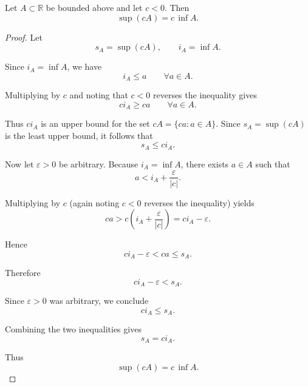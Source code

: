 \begin{theorem}
Let $A \subset \mathbb{R}$ be bounded above and let $c<0$.
Then
\[
\sup(cA)=c\,\inf A .
\]
\end{theorem}

\begin{proof}
Let
\[
s_A = \sup(cA), \qquad i_A = \inf A .
\]

Since $i_A=\inf A$, we have
\[
i_A \le a \qquad \forall a \in A.
\]

Multiplying by $c$ and noting that $c<0$ reverses the inequality gives
\[
c i_A \ge c a \qquad \forall a \in A.
\]

Thus $c i_A$ is an upper bound for the set $cA=\{ca : a\in A\}$.
Since $s_A=\sup(cA)$ is the least upper bound, it follows that
\[
s_A \le c i_A.
\]

Now let $\varepsilon>0$ be arbitrary. Because $i_A=\inf A$, there exists
$a\in A$ such that
\[
a < i_A + \frac{\varepsilon}{|c|}.
\]

Multiplying by $c$ (again noting $c<0$ reverses the inequality) yields
\[
c a > c\!\left(i_A + \frac{\varepsilon}{|c|}\right)
     = c i_A - \varepsilon .
\]

Hence
\[
c i_A - \varepsilon < c a \le s_A .
\]

Therefore
\[
c i_A - \varepsilon < s_A .
\]

Since $\varepsilon>0$ was arbitrary, we conclude
\[
c i_A \le s_A .
\]

Combining the two inequalities gives
\[
s_A = c i_A .
\]

Thus
\[
\sup(cA)=c\,\inf A.
\]
\end{proof}